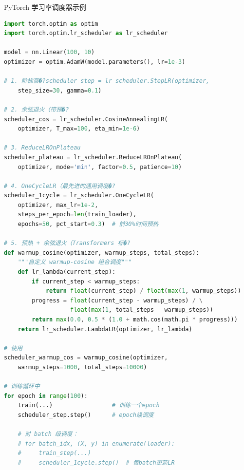 \begin{mycode}{PyTorch 学习率调度器示例}
\begin{lstlisting}[language=Python]
import torch.optim as optim
import torch.optim.lr_scheduler as lr_scheduler

model = nn.Linear(100, 10)
optimizer = optim.AdamW(model.parameters(), lr=1e-3)

# 1. 阶梯衰�?scheduler_step = lr_scheduler.StepLR(optimizer,
    step_size=30, gamma=0.1)

# 2. 余弦退火（带预�?
scheduler_cos = lr_scheduler.CosineAnnealingLR(
    optimizer, T_max=100, eta_min=1e-6)

# 3. ReduceLROnPlateau
scheduler_plateau = lr_scheduler.ReduceLROnPlateau(
    optimizer, mode='min', factor=0.5, patience=10)

# 4. OneCycleLR（最先进的通用调度�?
scheduler_1cycle = lr_scheduler.OneCycleLR(
    optimizer, max_lr=1e-2,
    steps_per_epoch=len(train_loader),
    epochs=50, pct_start=0.3)  # 前30%时间预热

# 5. 预热 + 余弦退火（Transformers 标�?
def warmup_cosine(optimizer, warmup_steps, total_steps):
    """自定义 warmup-cosine 组合调度"""
    def lr_lambda(current_step):
        if current_step < warmup_steps:
            return float(current_step) / float(max(1, warmup_steps))
        progress = float(current_step - warmup_steps) / \
                   float(max(1, total_steps - warmup_steps))
        return max(0.0, 0.5 * (1.0 + math.cos(math.pi * progress)))
    return lr_scheduler.LambdaLR(optimizer, lr_lambda)

# 使用
scheduler_warmup_cos = warmup_cosine(optimizer,
    warmup_steps=1000, total_steps=10000)

# 训练循环中
for epoch in range(100):
    train(...)                 # 训练一个epoch
    scheduler_step.step()      # epoch级调度

    # 对 batch 级调度：
    # for batch_idx, (X, y) in enumerate(loader):
    #     train_step(...)
    #     scheduler_1cycle.step()  # 每batch更新LR
\end{lstlisting}
\end{mycode}

